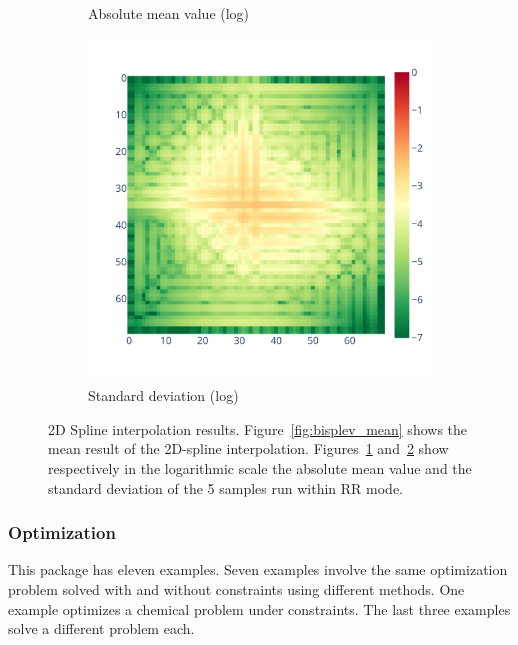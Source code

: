 \documentclass[10pt,journal,compsoc]{IEEEtran}
\begin{document}
\begin{figure}
\begin{subfigure}{.3\textwidth}
        \caption{Absolute mean value (log)}
        \label{fig:bisplev_mean_log}
    \end{subfigure}
    \begin{subfigure}{.3\textwidth}
        \centering
        \includegraphics[width=\linewidth]{figure/spline_2d/bisplev_std_log.pdf}
        \caption{Standard deviation (log)}
        \label{fig:bisplev_std_log}
    \end{subfigure}
    \caption{2D Spline interpolation results. Figure~\ref{fig:bisplev_mean} shows the mean result
        of the 2D-spline interpolation. Figures~\ref{fig:bisplev_mean_log} and~\ref{fig:bisplev_std_log}
        show respectively in the logarithmic scale the absolute mean value and the standard deviation 
        of the 5 samples run within RR mode. 
    }
    \label{fig:spline2d_rr}
\end{figure}


\subsubsection{Optimization}

This package has eleven examples. Seven examples involve the same optimization
problem solved with and without constraints using different methods. One example
optimizes a chemical problem under constraints. The last three examples solve a
different problem each.
\end{document}
